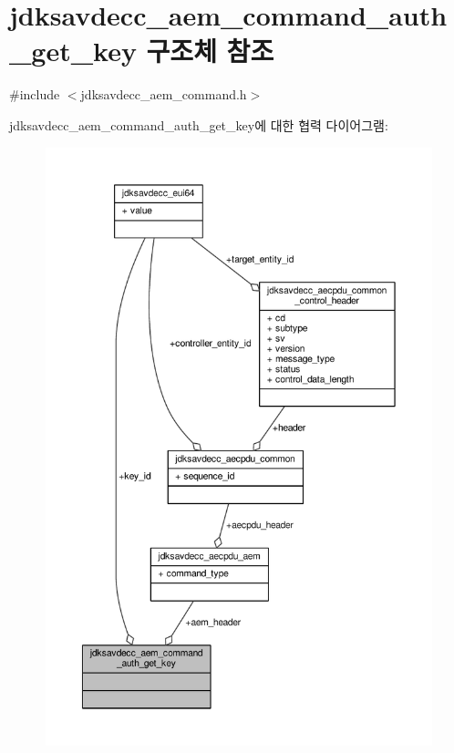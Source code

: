 \hypertarget{structjdksavdecc__aem__command__auth__get__key}{}\section{jdksavdecc\+\_\+aem\+\_\+command\+\_\+auth\+\_\+get\+\_\+key 구조체 참조}
\label{structjdksavdecc__aem__command__auth__get__key}


{\ttfamily \#include $<$jdksavdecc\+\_\+aem\+\_\+command.\+h$>$}



jdksavdecc\+\_\+aem\+\_\+command\+\_\+auth\+\_\+get\+\_\+key에 대한 협력 다이어그램\+:
\nopagebreak
\begin{figure}[H]
\begin{center}
\leavevmode
\includegraphics[width=350pt]{structjdksavdecc__aem__command__auth__get__key__coll__graph}
\end{center}
\end{figure}

